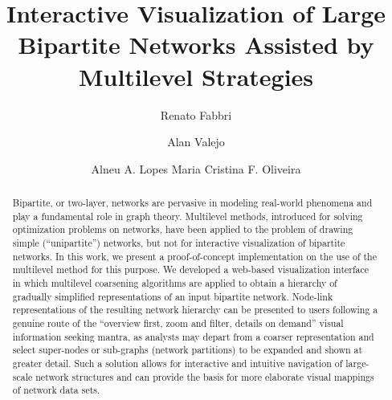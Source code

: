 \documentclass[runningheads]{llncs}
\begin{document}
%
\title{Interactive Visualization of Large Bipartite Networks Assisted by Multilevel Strategies}
%
%
\author{Renato Fabbri \and
Alan Valejo \and Alneu A. Lopes
Maria Cristina F. Oliveira}
%
%
%
\maketitle
%
\begin{abstract}
  Bipartite, or two-layer, networks are pervasive
  in modeling real-world phenomena and play a fundamental role in
  graph theory.
  Multilevel methods, introduced for solving optimization problems on networks, have been applied to the problem of drawing simple (``unipartite'') networks, but not for interactive visualization of bipartite networks.
  In this work, we present a proof-of-concept implementation on the use of the multilevel method for this purpose. We developed a web-based visualization interface in which multilevel coarsening algorithms are applied to obtain a hierarchy of gradually simplified representations of an input  bipartite network.
  Node-link representations of the resulting network hierarchy can be presented to users following a genuine route of the ``overview first, zoom and filter, details on demand'' visual information seeking mantra, as analysts may depart from a coarser representation and select super-nodes or sub-graphs (network partitions) to be expanded and shown at greater detail. 
    Such a solution allows for interactive and intuitive navigation of large-scale network structures and can provide the basis for more elaborate visual mappings of network data sets. 
   
  

\end{abstract}
%
\end{document}
